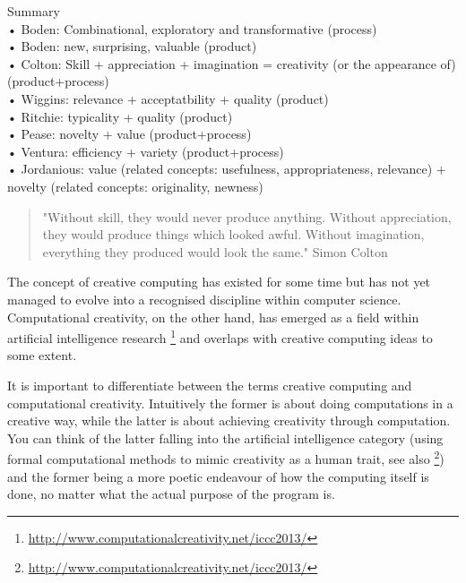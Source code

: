 \begin{shaded}
  Summary\\
  •	Boden: Combinational, exploratory and transformative \citep{Boden2003, Wiggins2006} (process)\\
  •	Boden: new, surprising, valuable \citep{Boden2003} (product)\\
  •	Colton: Skill + appreciation + imagination = creativity (or the appearance of) \citep{Colton2008a} (product+process)\\
  •	Wiggins: relevance + acceptatbility + quality \citep{Wiggins2006} (product)\\
  •	Ritchie: typicality + quality \citep{Ritchie2001, Ritchie2007} (product)\\
  •	Pease: novelty + value \citep{Pease2001} (product+process)\\
  •	Ventura: efficiency + variety \citep{Ventura2008} (product+process)\\
  •	Jordanious: value (related concepts: usefulness, appropriateness, relevance) + novelty (related concepts: originality, newness) \citep{Jordanous2012}
\end{shaded}

\begin{quote}
  "Without skill, they would never produce anything. Without appreciation, they would produce things which looked awful. Without imagination, everything they produced would look the same." Simon Colton \citep{Colton2008}
\end{quote}


The concept of creative computing has existed for some time but has not yet managed to evolve into a recognised discipline within computer science. Computational creativity, on the other hand, has emerged as a field within artificial intelligence research \footnote{\url{http://www.computationalcreativity.net/iccc2013/}} and overlaps with creative computing ideas to some extent.

It is important to differentiate between the terms creative computing and computational creativity. Intuitively the former is about doing computations in a creative way, while the latter is about achieving creativity through computation. You can think of the latter falling into the artificial intelligence category (using formal computational methods to mimic creativity as a human trait, see also \footnote{\url{http://www.computationalcreativity.net/iccc2013/}}) and the former being a more poetic endeavour of how the computing itself is done, no matter what the actual purpose of the program is.

